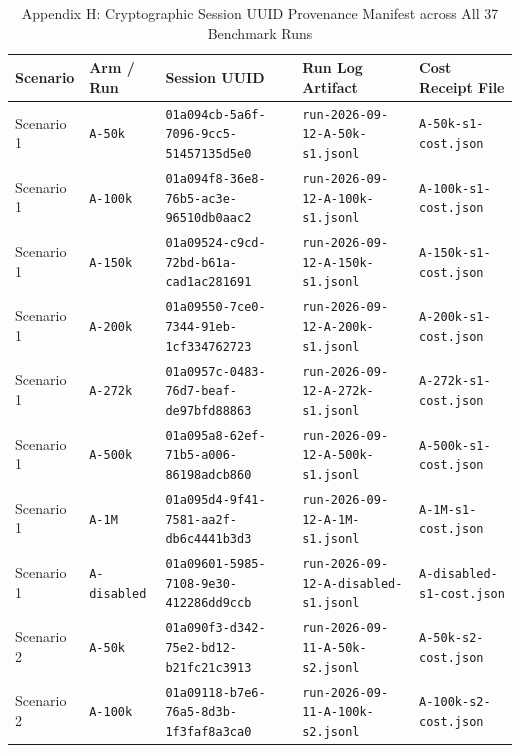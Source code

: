 \documentclass[10pt,twocolumn,a4paper]{article}
\begin{document}
\begin{table}[t]
\caption{Appendix H: Cryptographic Session UUID Provenance Manifest across All 37 Benchmark Runs}
\label{tab:app_uuid_manifest}
\centering
\scriptsize
\setlength{\tabcolsep}{2.5pt}
\begin{tabular}{@{}p{18mm}p{18mm}p{54mm}p{45mm}p{30mm}@{}}
\toprule
\textbf{Scenario} & \textbf{Arm / Run} & \textbf{Session UUID} & \textbf{Run Log Artifact} & \textbf{Cost Receipt File} \\
\midrule
Scenario 1 & \texttt{A-50k} & {\tiny\texttt{01a094cb-5a6f-7096-9cc5-51457135d5e0}} & {\tiny\texttt{run-2026-09-12-A-50k-s1.jsonl}} & {\tiny\texttt{A-50k-s1-cost.json}} \\
Scenario 1 & \texttt{A-100k} & {\tiny\texttt{01a094f8-36e8-76b5-ac3e-96510db0aac2}} & {\tiny\texttt{run-2026-09-12-A-100k-s1.jsonl}} & {\tiny\texttt{A-100k-s1-cost.json}} \\
Scenario 1 & \texttt{A-150k} & {\tiny\texttt{01a09524-c9cd-72bd-b61a-cad1ac281691}} & {\tiny\texttt{run-2026-09-12-A-150k-s1.jsonl}} & {\tiny\texttt{A-150k-s1-cost.json}} \\
Scenario 1 & \texttt{A-200k} & {\tiny\texttt{01a09550-7ce0-7344-91eb-1cf334762723}} & {\tiny\texttt{run-2026-09-12-A-200k-s1.jsonl}} & {\tiny\texttt{A-200k-s1-cost.json}} \\
Scenario 1 & \texttt{A-272k} & {\tiny\texttt{01a0957c-0483-76d7-beaf-de97bfd88863}} & {\tiny\texttt{run-2026-09-12-A-272k-s1.jsonl}} & {\tiny\texttt{A-272k-s1-cost.json}} \\
Scenario 1 & \texttt{A-500k} & {\tiny\texttt{01a095a8-62ef-71b5-a006-86198adcb860}} & {\tiny\texttt{run-2026-09-12-A-500k-s1.jsonl}} & {\tiny\texttt{A-500k-s1-cost.json}} \\
Scenario 1 & \texttt{A-1M} & {\tiny\texttt{01a095d4-9f41-7581-aa2f-db6c4441b3d3}} & {\tiny\texttt{run-2026-09-12-A-1M-s1.jsonl}} & {\tiny\texttt{A-1M-s1-cost.json}} \\
Scenario 1 & \texttt{A-disabled} & {\tiny\texttt{01a09601-5985-7108-9e30-412286dd9ccb}} & {\tiny\texttt{run-2026-09-12-A-disabled-s1.jsonl}} & {\tiny\texttt{A-disabled-s1-cost.json}} \\
\midrule
Scenario 2 & \texttt{A-50k} & {\tiny\texttt{01a090f3-d342-75e2-bd12-b21fc21c3913}} & {\tiny\texttt{run-2026-09-11-A-50k-s2.jsonl}} & {\tiny\texttt{A-50k-s2-cost.json}} \\
Scenario 2 & \texttt{A-100k} & {\tiny\texttt{01a09118-b7e6-76a5-8d3b-1f3faf8a3ca0}} & {\tiny\texttt{run-2026-09-11-A-100k-s2.jsonl}} & {\tiny\texttt{A-100k-s2-cost.json}} \\

\end{tabular}
\end{table}
\end{document}
